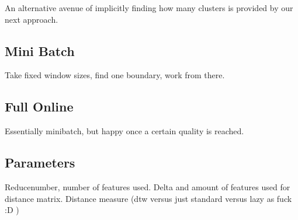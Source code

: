 An alternative avenue of implicitly finding how many clusters is provided by our next approach.

\subsection{Mini Batch}
Take fixed window sizes, find one boundary, work from there. 
\subsection{Full Online}
Essentially minibatch, but happy once a certain quality is reached.
\subsection{Parameters}
Reducenumber, number of features used. Delta and amount of features used for distance matrix. Distance measure (dtw versus just standard versus lazy as fuck :D )
